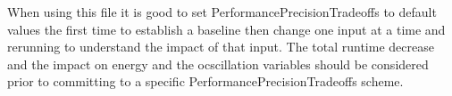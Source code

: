 When using this file it is good to set PerformancePrecisionTradeoffs to default values the first time to establish a baseline then change one input at a time and rerunning to understand the impact of that input. The total runtime decrease
and the impact on energy and the ocscillation variables should be considered prior to committing to a specific PerformancePrecisionTradeoffs scheme.
